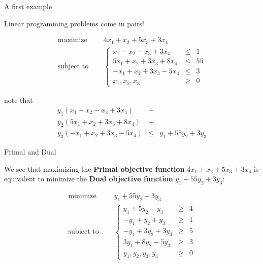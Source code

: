 \documentclass[c]{beamer}
\begin{document}
\begin{frame}[allowframebreaks]{A first example}

  Linear programming problems come in pairs!

  \begin{equation*}
    \begin{aligned}
      \text{maximize  } \quad & 4x_1 + x_2 +5x_3 +3x_4 \\
      \text{subject to }\quad &
      \left\{
      \begin{array}{rcl}
        x_1 - x_2 -x_3 +3x_4 &\leq &1 \\
        5x_1 + x_2 +3x_3 +8x_4 &\leq &55 \\
        -x_1 + x_2 +3x_3 -5x_4 &\leq &3 \\
        x_1,x_2,x_3 &\geq& 0
      \end{array}
      \right.
    \end{aligned}
  \end{equation*}

note that
\begin{eqnarray*}
  y_1(x_1 - x_2 -x_3 +3x_4)&+&\\y_2(5x_1 + x_2 +3x_3 +8x_4)&+&\\y_3(-x_1 + x_2 +3x_3 -5x_4) &\leq& y_1+55y_2+3y_3
\end{eqnarray*}

\end{frame}
\begin{frame}{Primal and Dual}

We see that maximizing the {\bf Primal objective function} $4x_1 + x_2 +5x_3 +3x_4$ is
  equivalent to minimize the {\bf Dual objective function} $y_1+55y_2+3y_3$:

    \begin{equation*}
    \begin{aligned}
      \text{minimize } \quad & y_1+55y_2+3y_3 \\
      \text{subject to }\quad &
      \left\{
      \begin{array}{rcl}
        y_1 + 5y_2 -y_3 &\geq &4 \\
        -y_1 +y_2 +y_3 &\geq &1 \\
        -y_1 +3y_2 +3y_3 &\geq &5 \\
        3y_1 +8y_2 -5y_3 &\geq &3 \\
        y_1,y_2,y_3,y_4 &\geq& 0
      \end{array}
      \right.
    \end{aligned}
  \end{equation*}

  \end{frame}
\end{document}
